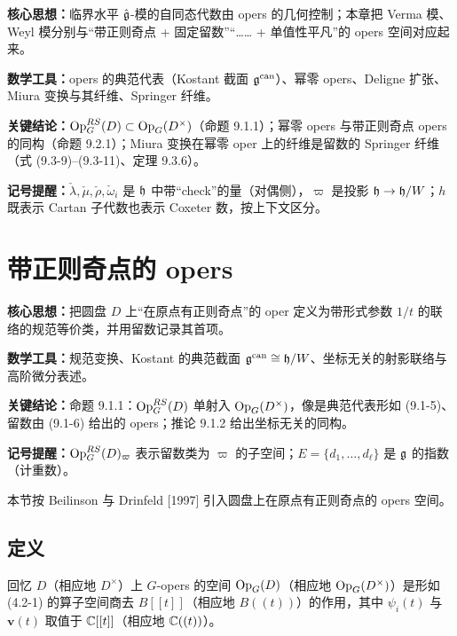 \begin{keypoints}
    \item \textbf{核心思想：}临界水平 $\hat{\mathfrak{g}}$-模的自同态代数由 opers 的几何控制；本章把 Verma 模、Weyl 模分别与“带正则奇点 + 固定留数”“…… + 单值性平凡”的 opers 空间对应起来。
    \item \textbf{数学工具：}opers 的典范代表（Kostant 截面 $\mathfrak{g}^{\mathrm{can}}$）、幂零 opers、Deligne 扩张、Miura 变换与其纤维、Springer 纤维。
    \item \textbf{关键结论：}$\operatorname{Op}^{RS}_G(D)\subset\operatorname{Op}_G(D^\times)$（命题 9.1.1）；幂零 opers 与带正则奇点 opers 的同构（命题 9.2.1）；Miura 变换在幂零 oper 上的纤维是留数的 Springer 纤维（式 (9.3-9)–(9.3-11)、定理 9.3.6）。
    \item \textbf{记号提醒：}$\check\lambda,\check\mu,\check\rho,\check\omega_i$ 是 $\mathfrak{h}$ 中带“check”的量（对偶侧），$\varpi$ 是投影 $\mathfrak{h}\to\mathfrak{h}/W$；$h$ 既表示 Cartan 子代数也表示 Coxeter 数，按上下文区分。
\end{keypoints}

\section{带正则奇点的 opers}

\begin{keypoints}
    \item \textbf{核心思想：}把圆盘 $D$ 上“在原点有正则奇点”的 oper 定义为带形式参数 $1/t$ 的联络的规范等价类，并用留数记录其首项。
    \item \textbf{数学工具：}规范变换、Kostant 的典范截面 $\mathfrak{g}^{\mathrm{can}}\cong\mathfrak{h}/W$、坐标无关的射影联络与高阶微分表述。
    \item \textbf{关键结论：}命题 9.1.1：$\operatorname{Op}^{RS}_G(D)$ 单射入 $\operatorname{Op}_G(D^\times)$，像是典范代表形如 (9.1-5)、留数由 (9.1-6) 给出的 opers；推论 9.1.2 给出坐标无关的同构。
    \item \textbf{记号提醒：}$\operatorname{Op}^{RS}_G(D)_\varpi$ 表示留数类为 $\varpi$ 的子空间；$E=\{d_1,\dots,d_\ell\}$ 是 $\mathfrak{g}$ 的指数（计重数）。
\end{keypoints}

本节按 Beilinson 与 Drinfeld [1997] 引入圆盘上在原点有正则奇点的 opers 空间。

\subsection{定义}

回忆 $D$（相应地 $D^\times$）上 $G$-opers 的空间 $\operatorname{Op}_G(D)$（相应地 $\operatorname{Op}_G(D^\times)$）是形如 (4.2-1) 的算子空间商去 $B[[t]]$（相应地 $B((t))$）的作用，其中 $\psi_i(t)$ 与 $\mathbf{v}(t)$ 取值于 $\mathbb{C}[[t]]$（相应地 $\mathbb{C}((t))$）。

